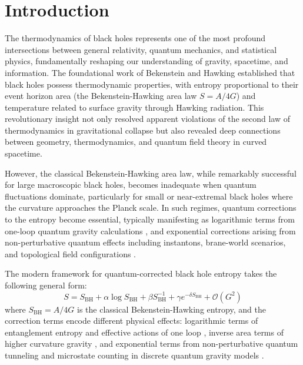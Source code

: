 \documentclass[superscriptaddress, prd, aps,amsmath,amssymb,showpacs,showkeys, onecolumn]{revtex4-2}
\begin{document}

\maketitle
\section{Introduction}

The thermodynamics of black holes represents one of the most profound intersections between general relativity, quantum mechanics, and statistical physics, fundamentally reshaping our understanding of gravity, spacetime, and information. The foundational work of Bekenstein \cite{Bekenstein1973} and Hawking \cite{Hawking1974,Hawking1975} established that black holes possess thermodynamic properties, with entropy proportional to their event horizon area (the Bekenstein-Hawking area law $S = A/4G$) and temperature related to surface gravity through Hawking radiation. This revolutionary insight not only resolved apparent violations of the second law of thermodynamics in gravitational collapse but also revealed deep connections between geometry, thermodynamics, and quantum field theory in curved spacetime.

However, the classical Bekenstein-Hawking area law, while remarkably successful for large macroscopic black holes, becomes inadequate when quantum fluctuations dominate, particularly for small or near-extremal black holes where the curvature approaches the Planck scale. In such regimes, quantum corrections to the entropy become essential, typically manifesting as logarithmic terms from one-loop quantum gravity calculations \cite{Solodukhin2011,Sen2012}, and exponential corrections arising from non-perturbative quantum effects including instantons, brane-world scenarios, and topological field configurations \cite{Banerjee2010,Majhi2012}.

The modern framework for quantum-corrected black hole entropy takes the following general form:
\begin{equation}
S = S_{\text{BH}} + \alpha \log S_{\text{BH}} + \beta S_{\text{BH}}^{-1} + \gamma e^{-\delta S_{\text{BH}}} + \mathcal{O}(G^2)
\end{equation}
where $S_{\text{BH}} = A/4G$ is the classical Bekenstein-Hawking entropy, and the correction terms encode different physical effects: logarithmic terms of entanglement entropy and effective actions of one loop \cite{Fursaev1995,Mann1997}, inverse area terms of higher curvature gravity \cite{Jacobson2003}, and exponential terms from non-perturbative quantum tunneling and microstate counting in discrete quantum gravity models \cite{Carlip2000,Kaul2000}.
\end{document}
